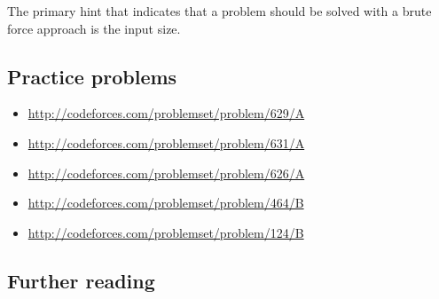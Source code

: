 The primary hint that indicates that a problem should be solved with a brute force approach is the input size.

\subsection*{Practice problems}

\begin{itemize}
\item \url{http://codeforces.com/problemset/problem/629/A}
\item \url{http://codeforces.com/problemset/problem/631/A}
\item \url{http://codeforces.com/problemset/problem/626/A}
\item \url{http://codeforces.com/problemset/problem/464/B}
\item \url{http://codeforces.com/problemset/problem/124/B}
\end{itemize}

\subsection*{Further reading}
